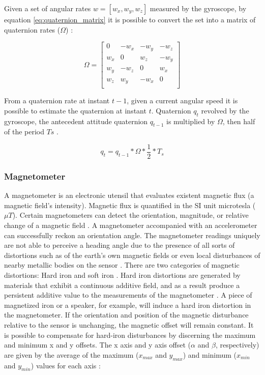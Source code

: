 Given a set of angular rates $w=[w_x,w_y,w_z]$ measured by the gyroscope, by equation \ref{eq:quaternion_matrix} it is possible to convert the set into a matrix of quaternion rates ($\Omega$) \cite{trusov2011overview}:

\begin{equation}
    \Omega = \begin{bmatrix}
        0   & -w_x & -w_y & -w_z \\
        w_x & 0    & w_z  & -w_y \\
        w_y & -w_z & 0    & w_x  \\
        w_z & w_y  & -w_x & 0    \\
    \end{bmatrix}
\end{equation}

From a quaternion rate at instant $t-1$, given a current angular speed it is possible to estimate the quaternion at instant $t$. Quaternion $q_t$ revolved by the gyroscope, the antecedent attitude quaternion $q_{t-1}$ is multiplied by $\Omega$, then half of the period $Ts$ \cite{trusov2011overview}.

\begin{equation}
    q_t = q_{t-1} \ast \Omega \ast \frac{1}{2} \ast T_s
\end{equation}

\subsubsection{Magnetometer}

A magnetometer is an electronic utensil that evaluates existent magnetic flux (a magnetic field's intensity). Magnetic flux is quantified in the SI unit microtesla ($\mu T$). Certain magnetometers can detect the orientation, magnitude, or relative change of a magnetic field \cite{caruso1998new}. A magnetometer accompanied with an accelerometer can successfully reckon an orientation angle. The magnetometer readings uniquely are not able to perceive a heading angle due to the presence of all sorts of distortions such as of the earth's own magnetic fields or even local disturbances of nearby metallic bodies on the sensor \cite{silva2021error} \cite{caruso1998new}. There are two categories of magnetic distortions: Hard iron and soft iron \cite{wahdan2014magnetometer}. Hard iron distortions are generated by materials that exhibit a continuous additive field, and as a result produce a persistent additive value to the measurements of the magnetometer \cite{guo2008soft}. A piece of magnetized iron or a speaker, for example, will induce a hard iron distortion in the magnetometer. If the orientation and position of the magnetic disturbance relative to the sensor is unchanging, the magnetic offset will remain constant. It is possible to compensate for hard-iron disturbances by discerning the maximum and minimum x and y offsets. The x axis and y axis offset ($\alpha$ and $\beta$, respectively) are given by the average of the maximum ($x_{max}$ and $y_{max}$) and minimum ($x_{min}$ and $y_{min}$) values for each axis \cite{daponte2017method}:

